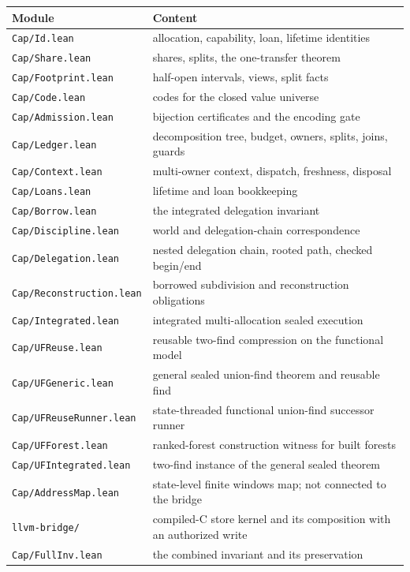 \documentclass[10pt,a4paper]{article}
\newcommand{\file}[1]{\texttt{\small #1}}
\begin{document}
\begin{center}
\begin{tabular}{@{}ll@{}}
\toprule
Module & Content \\
\midrule
\file{Cap/Id.lean} & allocation, capability, loan, lifetime identities \\
\file{Cap/Share.lean} & shares, splits, the one-transfer theorem \\
\file{Cap/Footprint.lean} & half-open intervals, views, split facts \\
\file{Cap/Code.lean} & codes for the closed value universe \\
\file{Cap/Admission.lean} & bijection certificates and the encoding gate \\
\file{Cap/Ledger.lean} & decomposition tree, budget, owners, splits, joins, guards \\
\file{Cap/Context.lean} & multi-owner context, dispatch, freshness, disposal \\
\file{Cap/Loans.lean} & lifetime and loan bookkeeping \\
\file{Cap/Borrow.lean} & the integrated delegation invariant \\
\file{Cap/Discipline.lean} & world and delegation-chain correspondence \\
\file{Cap/Delegation.lean} & nested delegation chain, rooted path, checked begin/end \\
\file{Cap/Reconstruction.lean} & borrowed subdivision and reconstruction obligations \\
\file{Cap/Integrated.lean} & integrated multi-allocation sealed execution \\
\file{Cap/UFReuse.lean} & reusable two-find compression on the functional model \\
\file{Cap/UFGeneric.lean} & general sealed union-find theorem and reusable find \\
\file{Cap/UFReuseRunner.lean} & state-threaded functional union-find successor runner \\
\file{Cap/UFForest.lean} & ranked-forest construction witness for built forests \\
\file{Cap/UFIntegrated.lean} & two-find instance of the general sealed theorem \\
\file{Cap/AddressMap.lean} & state-level finite windows map; not connected to the bridge \\
\file{llvm-bridge/} & compiled-C store kernel and its composition with an authorized write \\
\file{Cap/FullInv.lean} & the combined invariant and its preservation \\

\end{tabular}
\end{center}
\end{document}
